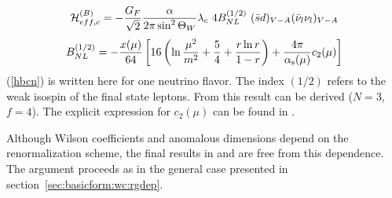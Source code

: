 \begin{equation}\label{hbcn} {\cal H}^{(B)}_{eff,c}=-{G_F \over{\sqrt 2}}
  {\alpha\over 2\pi \sin^2\Theta_W} \lambda_c\ 4 B^{(1/2)}_{NL}\
   (\bar sd)_{V-A}(\bar\nu_l\nu_l)_{V-A}  \end{equation}
\begin{equation}\label{bnl} B^{(1/2)}_{NL}=-{x(\mu)\over 64}\left[
16\left(\ln{\mu^2\over m^2}+
{5\over 4}+{r\ln r\over 1-r}\right) + \frac{4 \pi}{\alpha_{\rm s}(\mu)} c_2(\mu) \right]
\end{equation}
(\ref{hbcn}) is written here for one neutrino flavor. The index $(1/2)$
refers to the weak isospin of the final state leptons.
From this result  can be derived ($N=3$, $f=4$).
The explicit expression for $c_2(\mu)$ can be found in
\cite{buchallaburas:94}.

Although Wilson coefficients and anomalous dimensions depend on the
renormalization scheme, the final results in \eqn{cnln} and 
are free from this dependence. The argument proceeds as in the
general case presented in section~\ref{sec:basicform:wc:rgdep}.

